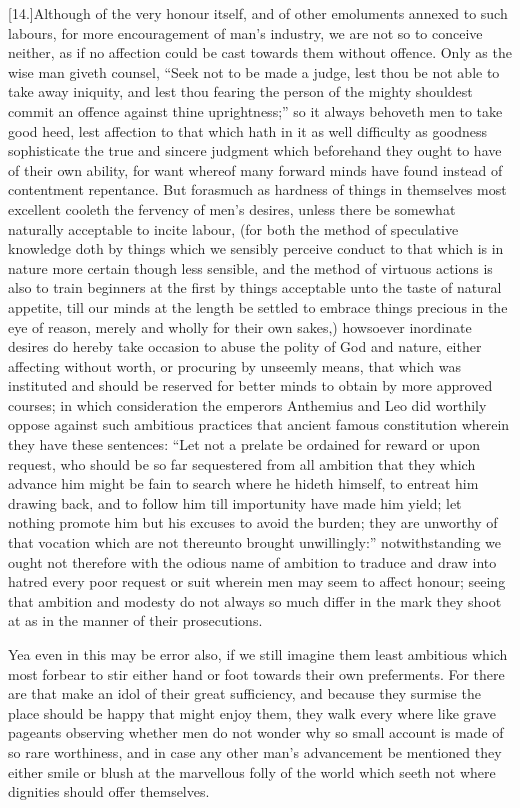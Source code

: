 [14.]Although of the very honour itself, and of other emoluments annexed to such labours, for more encouragement of man’s industry, we are not so to conceive neither, as if no affection could be cast towards them without offence. Only as the wise man giveth counsel, “Seek not to be made a judge, lest thou be not able to take away iniquity, and lest thou fearing the person of the mighty shouldest commit an offence against thine uprightness;” so it always behoveth men to take good heed, lest affection to that which hath in it as well difficulty as goodness sophisticate the true and sincere judgment which beforehand they ought to have of their own ability, for want whereof many forward minds have found instead of contentment repentance. But forasmuch as hardness of things in themselves most excellent cooleth the fervency of men’s desires, unless there be somewhat naturally acceptable to incite labour, (for both the  method of speculative knowledge doth by things which we sensibly perceive conduct to that which is in nature more certain though less sensible,
 and the method of virtuous actions is also to train beginners at the first by things acceptable unto the taste of natural appetite, till our minds at the length be settled to embrace things precious in the eye of reason, merely and wholly for their own sakes,) howsoever inordinate desires do hereby take occasion to abuse the polity of God and nature, either affecting without worth, or procuring by unseemly means, that which was instituted and should be reserved for better minds to obtain by more approved courses; in which consideration the emperors Anthemius and Leo did worthily oppose against such ambitious practices that ancient famous constitution wherein they have these sentences: “Let not a prelate be ordained for reward or upon request, who should be so far sequestered from all ambition that they which advance him might be fain to search where he hideth himself, to entreat him drawing back, and to follow him till importunity have made him yield; let nothing promote him but his excuses to avoid the burden; they are unworthy of that vocation which are not thereunto brought unwillingly:” notwithstanding we ought not therefore with the odious name of ambition to traduce and draw into hatred every poor request or suit wherein men may seem to affect honour; seeing that ambition and modesty do not always so much differ in the mark they shoot at as in the manner of their prosecutions.

Yea even in this may be error also, if we still imagine them least ambitious which most forbear to stir either hand or foot towards their own preferments. For there are that make an idol of their great sufficiency, and because they surmise the place should be happy that might enjoy them, they walk every where like grave pageants observing whether men do not  wonder why so small account is made of so rare worthiness,
 and in case any other man’s advancement be mentioned they either smile or blush at the marvellous folly of the world which seeth not where dignities should offer themselves.


